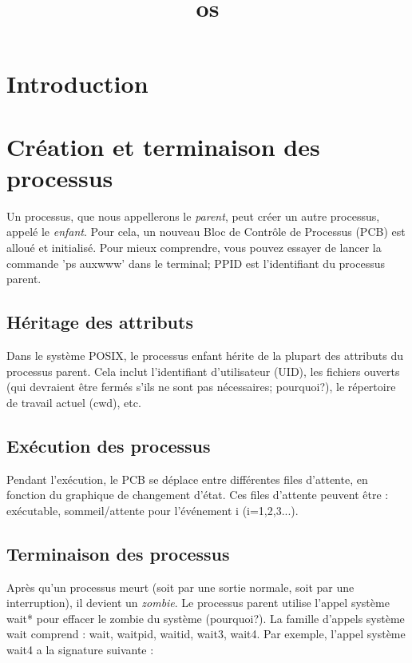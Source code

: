 \documentclass[12pt]{report}
\title{os}
\author{}
\begin{document}
\maketitle
\tableofcontents
\newpage

\section{Introduction}
\section{Création et terminaison des processus}

Un processus, que nous appellerons le \textit{parent}, peut créer un autre processus, appelé le \textit{enfant}. Pour cela, un nouveau Bloc de Contrôle de Processus (PCB) est alloué et initialisé. Pour mieux comprendre, vous pouvez essayer de lancer la commande 'ps auxwww' dans le terminal; PPID est l'identifiant du processus parent.

\subsection{Héritage des attributs}

Dans le système POSIX, le processus enfant hérite de la plupart des attributs du processus parent. Cela inclut l'identifiant d'utilisateur (UID), les fichiers ouverts (qui devraient être fermés s'ils ne sont pas nécessaires; pourquoi?), le répertoire de travail actuel (cwd), etc.

\subsection{Exécution des processus}

Pendant l'exécution, le PCB se déplace entre différentes files d'attente, en fonction du graphique de changement d'état. Ces files d'attente peuvent être : exécutable, sommeil/attente pour l'événement i (i=1,2,3...).

\subsection{Terminaison des processus}

Après qu'un processus meurt (soit par une sortie normale, soit par une interruption), il devient un \textit{zombie}. Le processus parent utilise l'appel système wait* pour effacer le zombie du système (pourquoi?). La famille d'appels système wait comprend : wait, waitpid, waitid, wait3, wait4. Par exemple, l'appel système wait4 a la signature suivante :
\end{document}
